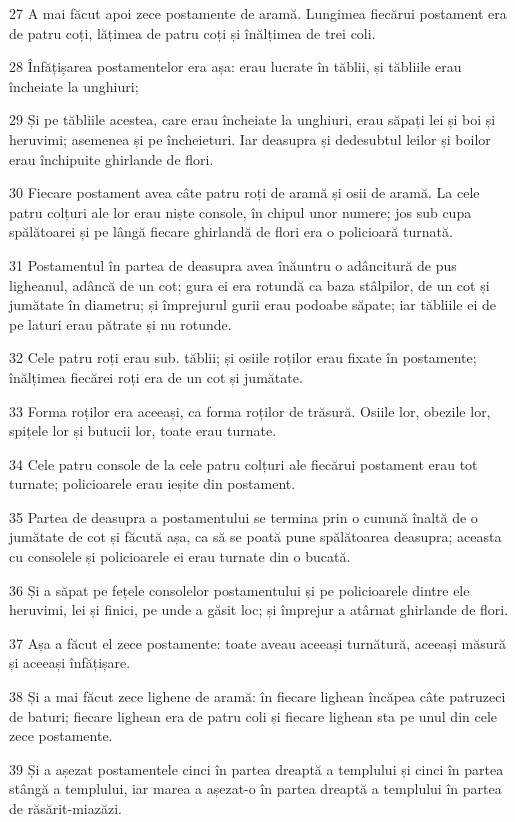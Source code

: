 \par 27 A mai făcut apoi zece postamente de aramă. Lungimea fiecărui postament era de patru coți, lățimea de patru coți și înălțimea de trei coli.
\par 28 Înfățișarea postamentelor era așa: erau lucrate în tăblii, și tăbliile erau încheiate la unghiuri;
\par 29 Și pe tăbliile acestea, care erau încheiate la unghiuri, erau săpați lei și boi și heruvimi; asemenea și pe încheieturi. Iar deasupra și dedesubtul leilor și boilor erau închipuite ghirlande de flori.
\par 30 Fiecare postament avea câte patru roți de aramă și osii de aramă. La cele patru colțuri ale lor erau niște console, în chipul unor numere; jos sub cupa spălătoarei și pe lângă fiecare ghirlandă de flori era o policioară turnată.
\par 31 Postamentul în partea de deasupra avea înăuntru o adâncitură de pus ligheanul, adâncă de un cot; gura ei era rotundă ca baza stâlpilor, de un cot și jumătate în diametru; și împrejurul gurii erau podoabe săpate; iar tăbliile ei de pe laturi erau pătrate și nu rotunde.
\par 32 Cele patru roți erau sub. tăblii; și osiile roților erau fixate în postamente; înălțimea fiecărei roți era de un cot și jumătate.
\par 33 Forma roților era aceeași, ca forma roților de trăsură. Osiile lor, obezile lor, spițele lor și butucii lor, toate erau turnate.
\par 34 Cele patru console de la cele patru colțuri ale fiecărui postament erau tot turnate; policioarele erau ieșite din postament.
\par 35 Partea de deasupra a postamentului se termina prin o cunună înaltă de o jumătate de cot și făcută așa, ca să se poată pune spălătoarea deasupra; aceasta cu consolele și policioarele ei erau turnate din o bucată.
\par 36 Și a săpat pe fețele consolelor postamentului și pe policioarele dintre ele heruvimi, lei și finici, pe unde a găsit loc; și împrejur a atârnat ghirlande de flori.
\par 37 Așa a făcut el zece postamente: toate aveau aceeași turnătură, aceeași măsură și aceeași înfățișare.
\par 38 Și a mai făcut zece lighene de aramă: în fiecare lighean încăpea câte patruzeci de baturi; fiecare lighean era de patru coli și fiecare lighean sta pe unul din cele zece postamente.
\par 39 Și a așezat postamentele cinci în partea dreaptă a templului și cinci în partea stângă a templului, iar marea a așezat-o în partea dreaptă a templului în partea de răsărit-miazăzi.
